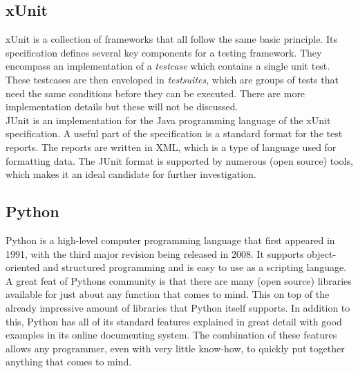 \documentclass[11pt,british]{article}
\begin{document}
\subsection{xUnit}
\label{subsec:xUnit}
xUnit is a collection of frameworks that all follow the same basic principle. Its specification defines several key components for a testing framework. They encompass an implementation of a \emph{testcase} which contains a single unit test. These testcases are then enveloped in \emph{testsuites}, which are groups of tests that need the same conditions before they can be executed.  There are more implementation details but these will not be discussed.\cite{xunit2}
\\[\baselineskip]
JUnit is an implementation for the Java programming language of the xUnit specification. A useful part of the specification is a standard format for the test reports. The reports are written in \gls{XML}, which is a type of language used for formatting data. The JUnit format is supported by numerous (open source) tools, which makes it an ideal candidate for further investigation.\cite{xunit,junitxml,junit}

\subsection{Python}
Python is a high-level computer programming language that first appeared in 1991, with the third major revision being released in 2008. It supports object-oriented and structured programming and is easy to use as a scripting language. A great feat of Pythons community is that there are many (open source) libraries available for just about any function that comes to mind. This on top of the already impressive amount of libraries that Python itself supports. In addition to this, Python has all of its standard features explained in great detail with good examples in its online documenting system. The combination of these features allows any programmer, even with very little know-how, to quickly put together anything that comes to mind.\cite{python1}

\end{document}
